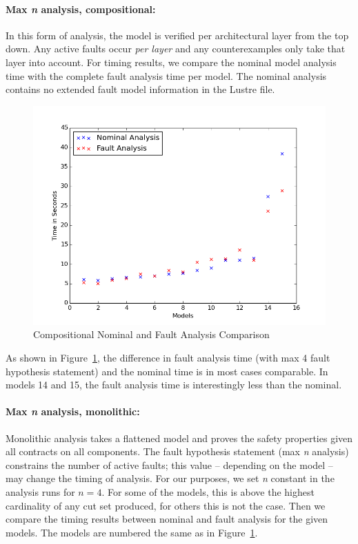 \paragraph{Max \textit{n} analysis, compositional:} In this form of analysis, the model is verified per architectural layer from the top down. Any active faults occur {\em per layer} and any counterexamples only take that layer into account. For timing results, we compare the nominal model analysis time with the complete fault analysis time per model. The nominal analysis contains no extended fault model information in the Lustre file.  

\begin{figure}[htbp]
	\begin{center}
		\includegraphics[width=.7\textwidth]{images/graphComp15Models.png}
	\end{center}
	\vspace{-0.3in}
	\caption{Compositional Nominal and Fault Analysis Comparison}
	\label{fig:graphComp15Models}
\end{figure}

As shown in Figure~\ref{fig:graphComp15Models}, the difference in fault analysis time (with max 4 fault hypothesis statement) and the nominal time is in most cases comparable. In models 14 and 15, the fault analysis time is interestingly less than the nominal. 

\paragraph{Max \textit{n} analysis, monolithic:} Monolithic analysis takes a flattened model and proves the safety properties given all contracts on all components. The fault hypothesis statement (max \textit{n} analysis) constrains the number of active faults; this value -- depending on the model -- may change the timing of analysis. For our purposes, we set \textit{n} constant in the analysis runs for $n = 4$. For some of the models, this is above the highest cardinality of any cut set produced, for others this is not the case. Then we compare the timing results between nominal and fault analysis for the given models. The models are numbered the same as in Figure~\ref{fig:graphComp15Models}.

